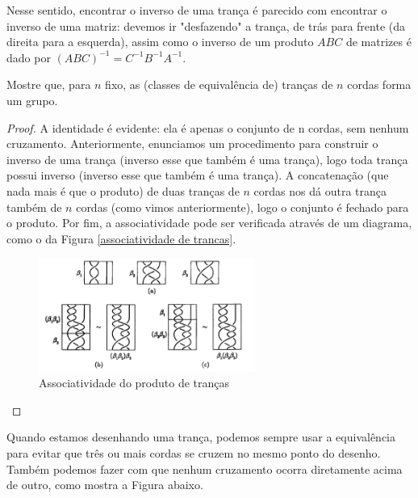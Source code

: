 	\begin{remark}
		Nesse sentido, encontrar o inverso de uma trança é parecido com encontrar o inverso de uma matriz: devemos ir "desfazendo" a trança, de trás para frente (da direita para a esquerda), assim como o inverso de um produto $ABC$ de matrizes é dado por $(ABC)^{-1} = C^{-1}B^{-1}A^{-1}$.
	\end{remark}
	
	\par\vspace{0.3cm} 
	
	\begin{lemma}
		\label{B_n grupo}
		Mostre que, para $n$ fixo, as (classes de equivalência de) tranças de $n$ cordas forma um grupo.
	\end{lemma}
	
	\begin{proof}
		A identidade é evidente: ela é apenas o conjunto de n cordas, sem nenhum cruzamento. Anteriormente, enunciamos um procedimento para construir o inverso de uma trança (inverso esse que também é uma trança), logo toda trança possui inverso (inverso esse que também é uma trança). A concatenação (que nada mais é que o produto) de duas tranças de $n$ cordas nos dá outra trança também de $n$ cordas (como vimos anteriormente), logo o conjunto é fechado para o produto. Por fim, a associatividade pode ser verificada através de um diagrama, como o da Figura \eqref{associatividade de trancas}.
		
		\begin{figure}[H]
			\captionsetup{justification=centering}
			\begin{center}
				\includegraphics[width=7.1cm]{Images/associatividade.png}
			\end{center}\caption{Associatividade do produto de tranças}\label{associatividade de trancas}
		\end{figure}
	\end{proof}
	\par\vspace{0.3cm} Quando estamos desenhando uma trança, podemos sempre usar a equivalência para evitar que três ou mais cordas se cruzem no mesmo ponto do desenho. Também podemos fazer com que nenhum cruzamento ocorra diretamente acima de outro, como mostra a Figura abaixo.
	
